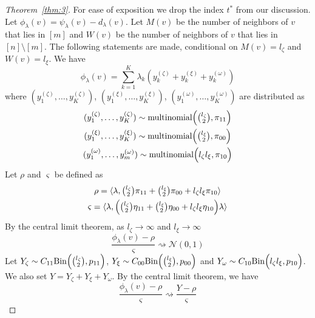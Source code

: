 \documentclass[draftcls]{IEEEtran}
\theoremstyle{definition}
\begin{document}
\begin{proof}[Theorem~\ref{thm:3}]
  For ease of exposition we drop the index $t^{*}$ from our discussion. Let
  $\phi_{\lambda}(v) = \psi_{\lambda}(v) - d_{\lambda}(v)$. Let
  $M(v)$ be the number of neighbors of $v$ that lies in $[m]$ and
  $W(v)$ be the number of neighbors of $v$ that lies in $[n]
\setminus [m]$. The following statements are made, conditional on
$M(v) = l_{\zeta}$ and $W(v) = l_{\xi}$. We have
\begin{equation}
  \phi_{\lambda}(v) = \sum_{k=1}^{K} \lambda_k ( y^{(\zeta)}_k +
  y^{(\xi)}_k + y^{(\omega)}_k)
\end{equation}
where $(y^{(\zeta)}_1, \dots, y^{(\zeta)}_K)$, $(y^{(\xi)}_1,\dots,
 y^{(\xi)}_K)$,  $(y^{(\omega)}_1, \dots, y^{(\omega)}_K)$ are
 distributed as
\begin{gather*}
(y^{(\zeta)}_1,\dots,y^{(\zeta)}_K) \sim \textrm{multinomial}\Bigl(
\tbinom{l_\zeta}{2}, \pi_{11}\Bigr) \\ 
(y^{(\xi)}_1,\dots,y^{(\xi)}_K) \sim \textrm{multinomial}\Bigl(
\tbinom{l_\xi}{2}, \pi_{00}\Bigr) \\
(y^{(\omega)}_1,\dots,y^{(\omega)}_m) \sim \textrm{multinomial}\Bigl(
l_\zeta l_\xi, \pi_{10}\Bigr)
\end{gather*}
Let $\rho$ and $\varsigma$ be defined as
\begin{gather*}
  \rho = \langle \lambda, \tbinom{l_{\zeta}}{2} \pi_{11} +
  \tbinom{l_{\xi}}{2} \pi_{00} + l_{\zeta} l_{\xi} \pi_{10} \rangle \\
  \varsigma = \langle \lambda, \Bigl(\tbinom{l_{\zeta}}{2} \eta_{11} +
  \tbinom{l_{\xi}}{2} \eta_{00} + l_{\zeta} l_{\xi} \eta_{10}\Bigr) \lambda
  \rangle
\end{gather*}
By the central limit theorem, as $l_{\zeta} \rightarrow
\infty$ and $l_{\xi} \rightarrow \infty$
\begin{equation}
  \label{eq:16}
  \frac{\phi_{\lambda}(v) - \rho}{\varsigma} \rightsquigarrow
  \mathcal{N}(0,1)
\end{equation}
Let $Y_{\zeta} \sim C_{11} \mathrm{Bin}\Bigl(\tbinom{l_{\zeta}}{2},
p_{11}\Bigr)$, $Y_{\xi} \sim C_{00} \mathrm{Bin}\Bigl(\tbinom{l_\xi}{2},
p_{00}\Bigr)$ and $Y_{\omega} \sim C_{10} \mathrm{Bin}\Bigl( l_{\zeta}
l_{\xi}, p_{10} \Bigr)$. We also set $Y = Y_{\zeta} + Y_{\xi} +
Y_{\omega}$. By the central limit theorem, we have
\begin{equation}
  \label{eq:21}
 \frac{\phi_{\lambda}(v) - \rho}{\varsigma} \rightsquigarrow
 \frac{Y - \rho}{\varsigma}
\end{equation}

\end{proof}
\end{document}
